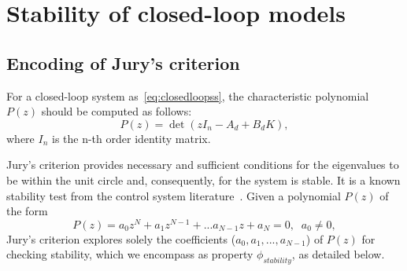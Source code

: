 \documentclass[runningheads,a4paper]{llncs}
\newcommand{\addtodo}[1]{{\color{red} TODO: #1}}
\begin{document}
\newpage


  

\newpage
\appendix
\section{Stability of closed-loop models}
\label{sec:appendix-stability}


\subsection{Encoding of Jury's criterion}

For a closed-loop system as~\eqref{eq:closedloopss}, 
the characteristic polynomial $P(z)$ should be computed as follows:
\begin{equation}
P(z)= \det( z I_{n} - A_d + B_d K ),
\end{equation}
where $I_{n}$ is the n-th order identity matrix. 

Jury's criterion provides necessary and sufficient conditions for the eigenvalues 
to be within the unit circle and, consequently, for the system is stable.  
It is a known stability test from the control system literature~\cite{fadali}.  
Given a 
polynomial $P(z)$ of the form
$$
P(z) = a_{0}z^{N} + a_{1}z^{N-1} + ... a_{N-1}z + a_{N} = 0, \;\; a_{0}\neq 0,
$$
Jury's criterion explores solely the coefficients ($a_{0},a_{1},...,a_{N-1}$) 
of $P(z)$ for checking stability, which we encompass as property $\phi_{stability}$, as detailed below. 
\end{document}
